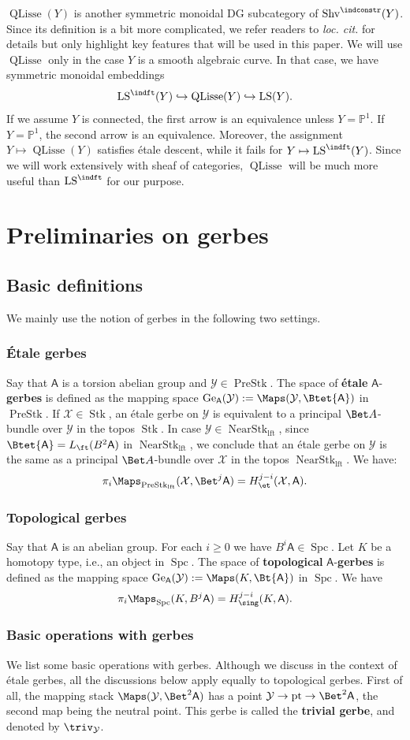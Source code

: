\documentclass[10pt]{amsart}
\newcommand{\sssec}{\subsubsection}
\theoremstyle{remark}
\newcommand{\pjl}{\mathbb{P}^1}
\newcommand{\on}{\operatorname}
\newcommand{\cX}{\mathcal{X}}
\newcommand{\cY}{\mathcal{Y}}
\newcommand{\Shv}{\on{Shv}}
\newcommand{\LS}{\on{LS}}
\newcommand{\QLisse}{\on{QLisse}}
\newcommand{\PreStk}{\on{PreStk}}
\newcommand{\PreStklft}{\on{PreStk}_{\on{lft}}}
\newcommand{\Stk}{\on{Stk}}
\newcommand{\NearStklft}{\on{NearStk}_{\on{lft}}}
\newcommand{\Spc}{\on{Spc}}
\newcommand{\pt}{\on{pt}}
\newcommand{\sfA}{\mathsf{A}}
\begin{document}
$\QLisse(Y)$ is another symmetric monoidal DG subcategory of $\Shv^{\indconstr}(Y)$. Since its definition is a bit more complicated, we refer readers to \emph{loc. cit.} for details but only highlight key features that will be used in this paper. We will use $\QLisse$ only in the case $Y$ is a smooth algebraic curve. In that case, we have symmetric monoidal embeddings
\[\LS^{\indft}(Y)\hookrightarrow \QLisse(Y)\hookrightarrow\LS(Y).\]
If we assume $Y$ is connected, the first arrow is an equivalence unless $Y=\pjl$. If $Y=\pjl$, the second arrow is an equivalence. Moreover, the assignment $Y\mapsto \QLisse(Y)$ satisfies \'etale descent, while it fails for $Y\mapsto\LS^{\indft}(Y)$. Since we will work extensively with sheaf of categories, $\QLisse$ will be much more useful than $\LS^{\indft}$ for our purpose.




\section{Preliminaries on gerbes}\label{sec: prelim on gerbes}

\subsection{Basic definitions}\label{ssec: basic definitions}
We mainly use the notion of gerbes in the following two settings.

\sssec{\'Etale gerbes}
Say that $\sfA$ is a torsion abelian group and $\cY\in \PreStk$. The space of \textbf{\'etale} $\sfA$-\textbf{gerbes} is defined as the mapping space $\on{Ge}_{\sfA}(\cY):=\Maps(\cY, \Btet{\sfA})$ in $\PreStk$. If $\cX\in\Stk$, an \'etale gerbe on $\cY$ is equivalent to a principal $\Bet A$-bundle over $\cY$ in the topos $\Stk$.
In case $\cY\in\NearStklft$,
since $\Btet{\sfA}=L_{\ft}(B^2 \sfA)$ in $\NearStklft$, we conclude that an \'etale gerbe on $\cY$ is the same as a principal $\Bet A$-bundle over $\cX$ in the topos $\NearStklft$.
We have:
\[\pi_i\Maps_{\PreStklft}(\cX,\Bet^j \sfA)=H^{j-i}_{\et}(\cX,\sfA).\]


\sssec{Topological gerbes} Say that $\sfA$ is an abelian group. For each $i\ge 0$ we have $B^i \sfA\in \Spc$. Let $K$ be a homotopy type, i.e., an object in $\Spc$. The space of \textbf{topological} $\sfA$-\textbf{gerbes} is defined as the mapping space $\on{Ge}_{\sfA}(\cY):=\Maps(K, \Bt{\sfA})$ in $\Spc$.
We have
\[\pi_i \Maps_{\Spc}(K,B^j \sfA)=H^{j-i}_{\sing}(K,\sfA).\]

\sssec{Basic operations with gerbes}
We list some basic operations with gerbes. Although we discuss in the context of \'etale gerbes, all the discussions below apply equally to topological gerbes. First of all, the mapping stack $\Maps(\cY,\Bet^2\sfA)$ has a point $\cY\rightarrow\pt\rightarrow\Bet^2 \sfA$, the second map being the neutral point. This gerbe is called the \textbf{trivial gerbe}, and denoted by $\triv_{\cY}$.
\medskip
\end{document}
